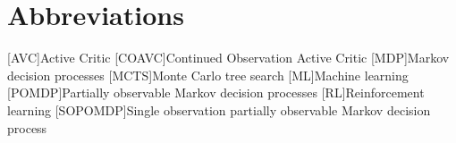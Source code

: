 
\chapter{Abbreviations}
\begin{acronym}
    [AVC]{Active Critic}
    [COAVC]{Continued Observation Active Critic}
    [MDP]{Markov decision processes}
    [MCTS]{Monte Carlo tree search}
    [ML]{Machine learning}
    [POMDP]{Partially observable Markov decision processes}
    [RL]{Reinforcement learning}
    [SOPOMDP]{Single observation partially observable Markov decision process}
\end{acronym}
